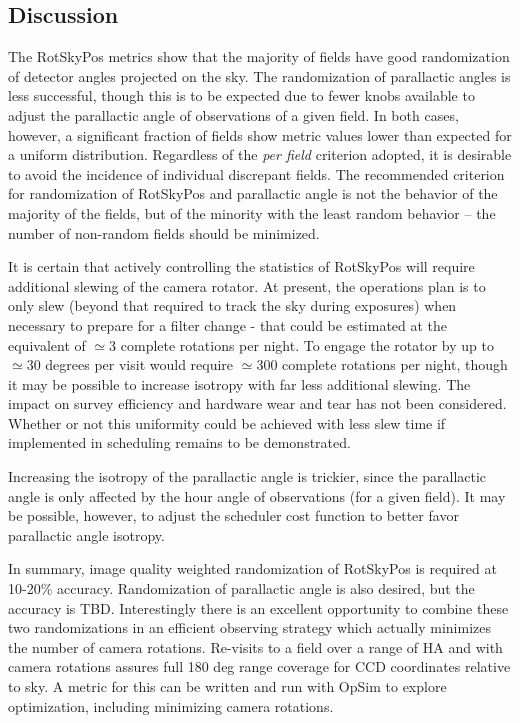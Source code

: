 \subsection{Discussion}

The RotSkyPos metrics show that the majority of fields have good randomization
of detector angles projected on the sky.  The randomization of parallactic
angles is less successful, though this is to be expected due to fewer knobs
available to adjust the parallactic angle of observations of a given field.  In
both cases, however, a significant fraction of fields show metric values lower
than expected for a uniform distribution.  Regardless of the \emph{per field}
criterion adopted, it is desirable to avoid the incidence of individual
discrepant fields.  The recommended criterion for randomization of RotSkyPos and
parallactic angle is not the behavior of the majority of the fields, but of the
minority with the least random behavior -- the number of non-random fields
should be minimized.

It is certain that actively controlling the statistics of RotSkyPos will require
additional slewing of the camera rotator.  At present, the operations plan is to
only slew (beyond that required to track the sky during exposures) when
necessary to prepare for a filter change - that could be estimated at the
equivalent of $\simeq 3$ complete rotations per night.  To engage the rotator by
up to $\simeq 30$ degrees per visit would require $\simeq 300$ complete
rotations per night, though it may be possible to increase isotropy with far
less additional slewing.  The impact on survey efficiency and hardware wear and
tear has not been considered.  Whether or not this uniformity could be achieved
with less slew time if implemented in scheduling remains to be demonstrated.

Increasing the isotropy of the parallactic angle is trickier, since the
parallactic angle is only affected by the hour angle of observations (for a
given field).  It may be possible, however, to adjust the scheduler cost
function to better favor parallactic angle isotropy.

In summary, image quality weighted randomization of RotSkyPos is required at
10-20\% accuracy.   Randomization of parallactic angle is also desired, but the
accuracy is TBD.  Interestingly there is an excellent  opportunity to combine
these two randomizations in an efficient observing strategy which actually
minimizes the number of camera rotations.   Re-visits to a field over a range of
HA and with camera rotations assures full 180 deg range coverage for CCD
coordinates relative to sky.  A metric for this can be written and run with
OpSim to explore optimization, including minimizing camera rotations.


